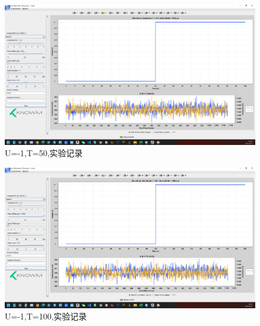 \documentclass[12pt,hyperref,a4paper,UTF8]{ctexart}
\begin{document}
\begin{figure}[H]
    \centering
    \begin{minipage}{1\textwidth}
        \centering
        \includegraphics[width=1\textwidth]{figures/U-1T50.png}
        \caption{U=-1,T=50,实验记录}
        \label{fig:U-1T50}
    \end{minipage}
\end{figure}

\begin{figure}[H]
    \centering
    \begin{minipage}{1\textwidth}
        \centering
        \includegraphics[width=1\textwidth]{figures/U-1T100.png}
        \caption{U=-1,T=100,实验记录}
        \label{fig:U-1T100}
    \end{minipage}
\end{figure}
\end{document}
